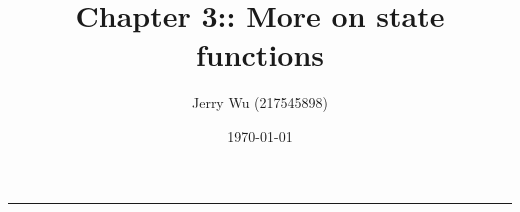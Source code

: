 \documentclass[12pt]{article}
\title{Chapter 3:: More on state functions}
\author{Jerry Wu (217545898)}
\date{\today}
\begin{document}
\maketitle
\rule{\textwidth}{0.4pt}
\end{document}

